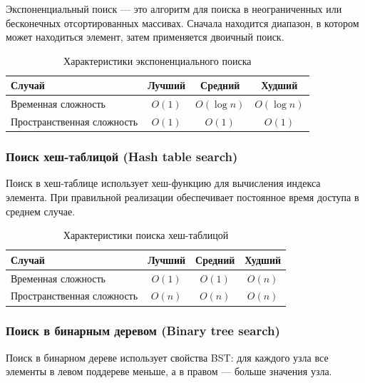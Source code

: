 \documentclass[a4paper,12pt]{article}
\begin{document}
Экспоненциальный поиск --- это алгоритм для поиска в неограниченных или бесконечных отсортированных массивах. Сначала находится диапазон, в котором может находиться элемент, затем применяется двоичный поиск.

\begin{table}[H]
    \centering
    \begin{tabular}{|l|c|c|c|}
        \hline
        Случай & Лучший & Средний & Худший \\
        \hline
        Временная сложность & $O(1)$ & $O(\log n)$ & $O(\log n)$ \\
        \hline
        Пространственная сложность & $O(1)$ & $O(1)$ & $O(1)$ \\
        \hline
    \end{tabular}
    \caption{Характеристики экспоненциального поиска}
\end{table}

\subsubsection{Поиск хеш-таблицой (Hash table search)}
\label{subsubsec:поиск-хеш-таблицой-hash-table-search}

Поиск в хеш-таблице использует хеш-функцию для вычисления индекса элемента. При правильной реализации обеспечивает постоянное время доступа в среднем случае.

\begin{table}[H]
    \centering
    \begin{tabular}{|l|c|c|c|}
        \hline
        Случай & Лучший & Средний & Худший \\
        \hline
        Временная сложность & $O(1)$ & $O(1)$ & $O(n)$ \\
        \hline
        Пространственная сложность & $O(n)$ & $O(n)$ & $O(n)$ \\
        \hline
    \end{tabular}
    \caption{Характеристики поиска хеш-таблицой}
\end{table}

\subsubsection{Поиск в бинарным деревом (Binary tree search)}
\label{subsubsec:поиск-в-бинарным-деревом-binary-tree-search}

Поиск в бинарном дереве использует свойства BST: для каждого узла все элементы в левом поддереве меньше, а в правом --- больше значения узла.
\end{document}
